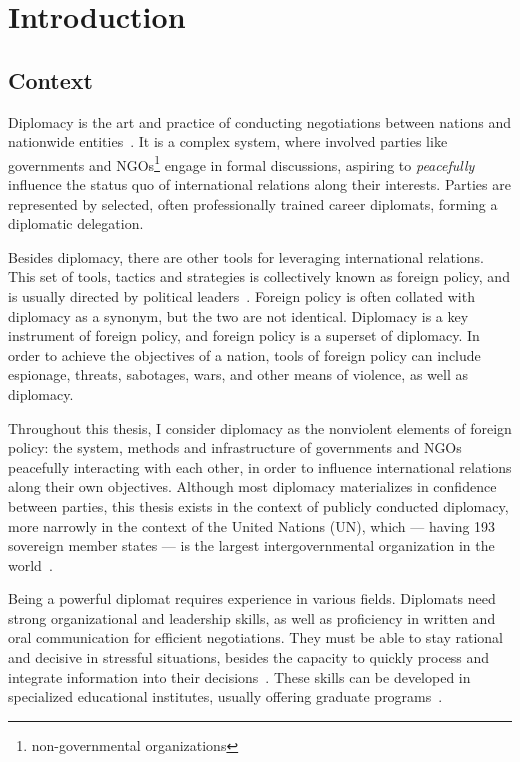 \chapter{Introduction}
\label{chapter:introduction}

\section{Context}

Diplomacy is the art and practice of conducting negotiations between nations and nationwide entities~\cite{diplomacymerriamwebster}. It is a complex system, where involved parties like governments and NGOs\footnote{non-governmental organizations} engage in formal discussions, aspiring to \emph{peacefully} influence the status quo of international relations along their interests. Parties are represented by selected, often professionally trained career diplomats, forming a diplomatic delegation.

Besides diplomacy, there are other tools for leveraging international relations. This set of tools, tactics and strategies is collectively known as foreign policy, and is usually directed by political leaders~\cite{foreignpolicybritannica}. Foreign policy is often collated with diplomacy as a synonym, but the two are not identical. Diplomacy is a key instrument of foreign policy, and foreign policy is a superset of diplomacy. In order to achieve the objectives of a nation, tools of foreign policy can include espionage, threats, sabotages, wars, and other means of violence, as well as diplomacy.

Throughout this thesis, I consider diplomacy as the nonviolent elements of foreign policy: the system, methods and infrastructure of governments and NGOs peacefully interacting with each other, in order to influence international relations along their own objectives. Although most diplomacy materializes in confidence between parties, this thesis exists in the context of publicly conducted diplomacy, more narrowly in the context of the United Nations (UN), which — having 193 sovereign member states — is the largest intergovernmental organization in the world~\cite{unmembers}.

Being a powerful diplomat requires experience in various fields. Diplomats need strong organizational and leadership skills, as well as proficiency in written and oral communication for efficient negotiations. They must be able to stay rational and decisive in stressful situations, besides the capacity to quickly process and integrate information into their decisions~\cite{fsicapabilities}. These skills can be developed in specialized educational institutes, usually offering graduate programs~\cite{usdoddiplomattrainings}.

